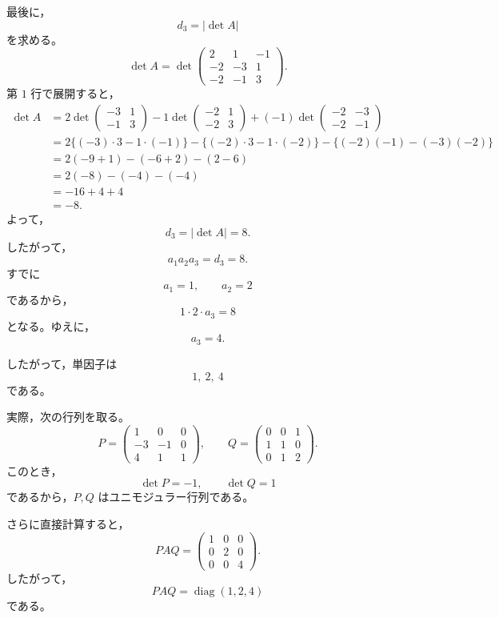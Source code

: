 \begin{solution}
\begin{enumerate}
		最後に，
		\[
		d_3=|\det A|
		\]
		を求める。
		\[
		\det A
		=
		\det
		\begin{pmatrix}
			2&1&-1\\
			-2&-3&1\\
			-2&-1&3
		\end{pmatrix}.
		\]
		第 \(1\) 行で展開すると，
		\[
		\begin{aligned}
			\det A
			&=
			2
			\det
			\begin{pmatrix}
				-3&1\\
				-1&3
			\end{pmatrix}
			-
			1
			\det
			\begin{pmatrix}
				-2&1\\
				-2&3
			\end{pmatrix}
			+
			(-1)
			\det
			\begin{pmatrix}
				-2&-3\\
				-2&-1
			\end{pmatrix}
			\\
			&=
			2\{(-3)\cdot 3-1\cdot(-1)\}
			-
			\{(-2)\cdot 3-1\cdot(-2)\}
			-
			\{(-2)(-1)-(-3)(-2)\}
			\\
			&=
			2(-9+1)
			-
			(-6+2)
			-
			(2-6)
			\\
			&=
			2(-8)-(-4)-(-4)
			\\
			&=
			-16+4+4
			\\
			&=
			-8.
		\end{aligned}
		\]
		よって，
		\[
		d_3=|\det A|=8.
		\]
		したがって，
		\[
		a_1a_2a_3=d_3=8.
		\]
		すでに
		\[
		a_1=1,
		\qquad
		a_2=2
		\]
		であるから，
		\[
		1\cdot 2\cdot a_3=8
		\]
		となる。ゆえに，
		\[
		a_3=4.
		\]
		
		したがって，単因子は
		\[
		\boxed{1,\ 2,\ 4}
		\]
		である。
		
		実際，次の行列を取る。
		\[
		P=
		\begin{pmatrix}
			1&0&0\\
			-3&-1&0\\
			4&1&1
		\end{pmatrix},
		\qquad
		Q=
		\begin{pmatrix}
			0&0&1\\
			1&1&0\\
			0&1&2
		\end{pmatrix}.
		\]
		このとき，
		\[
		\det P=-1,
		\qquad
		\det Q=1
		\]
		であるから，\(P,Q\) はユニモジュラー行列である。
		
		さらに直接計算すると，
		\[
		PAQ
		=
		\begin{pmatrix}
			1&0&0\\
			0&2&0\\
			0&0&4
		\end{pmatrix}.
		\]
		したがって，
		\[
		\boxed{
			PAQ=\operatorname{diag}(1,2,4)
		}
		\]
		である。
	\end{enumerate}
\end{solution}